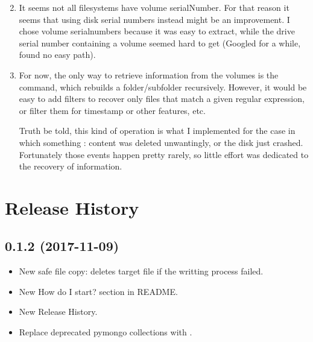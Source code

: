 \documentclass[letterpaper,10pt,english]{sphinxmanual}
\begin{document}
\begin{enumerate}
\setcounter{enumi}{1}
\item {} 
It seems not all filesystems have volume serialNumber. For that reason it seems that using disk serial numbers instead might be an improvement.
I chose volume serialnumbers because it was easy to extract, while the drive serial number containing a volume seemed hard to get (Googled for a while,
found no easy path).

\item {} 
For now, the only way to retrieve information from the volumes is the  command, which rebuilds a folder/subfolder recursively. However, it would be
easy to add filters to recover only files that match a given regular expression, or filter them for timestamp or other features, etc.

Truth be told, this kind of operation is what I implemented for the case in which something : content was deleted unwantingly, or the disk just crashed.
Fortunately those events happen pretty rarely, so little effort was dedicated to the recovery of information.

\end{enumerate}


\chapter{Release History}
\label{\detokenize{index:release-history}}

\section{0.1.2 (2017-11-09)}
\label{\detokenize{index:id6}}
\begin{itemize}
\item {} 
New safe file copy: deletes target file if the writting process failed.

\item {} 
New \sphinxquotedblleft{}How do I start?\sphinxquotedblright{} section in README.

\item {} 
New \sphinxquotedblleft{}Release History\sphinxquotedblright{}.

\item {} 
Replace deprecated pymongo collections  with .

\end{itemize}
\end{document}
